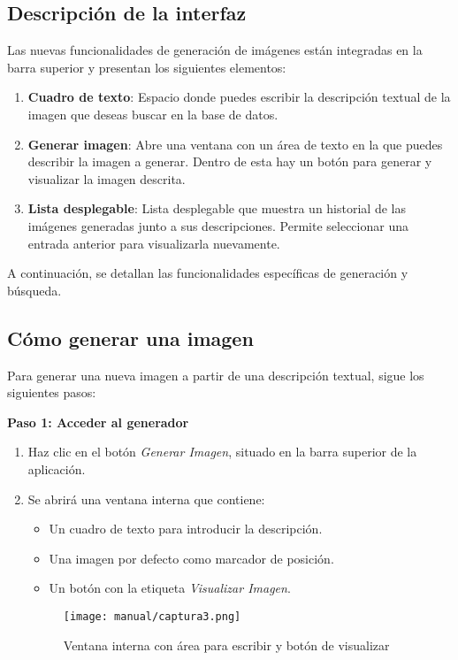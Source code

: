 \subsection{Descripción de la interfaz} 
Las nuevas funcionalidades de generación de imágenes están integradas en la barra superior y presentan los siguientes elementos:
\begin{enumerate}
    \item \textbf{Cuadro de texto}: Espacio donde puedes escribir la descripción textual de la imagen que deseas buscar en la base de datos.
    \item \textbf{Generar imagen}: Abre una ventana con un área de texto en la que puedes describir la imagen a generar. Dentro de esta hay un botón para generar y visualizar la imagen descrita.
    \item \textbf{Lista desplegable}: Lista desplegable que muestra un historial de las imágenes generadas junto a sus descripciones. Permite seleccionar una entrada anterior para visualizarla nuevamente.
\end{enumerate}

A continuación, se detallan las funcionalidades específicas de generación y búsqueda.


\subsection{Cómo generar una imagen}
Para generar una nueva imagen a partir de una descripción textual, sigue los siguientes pasos:

\textbf{Paso 1: Acceder al generador}
\begin{enumerate}
    \item Haz clic en el botón \textit{Generar Imagen}, situado en la barra superior de la aplicación.
    \item Se abrirá una ventana interna que contiene:
    \begin{itemize}
        \item Un cuadro de texto para introducir la descripción.
        \item Una imagen por defecto como marcador de posición.
        \item Un botón con la etiqueta \textit{Visualizar Imagen}.
    \end{itemize}
    
    \begin{figure}[H]
        \centering
        \texttt{[image: manual/captura3.png]}
        \caption{Ventana interna con área para escribir y botón de visualizar}
        \label{fig:visualizar}
    \end{figure}
\end{enumerate}

